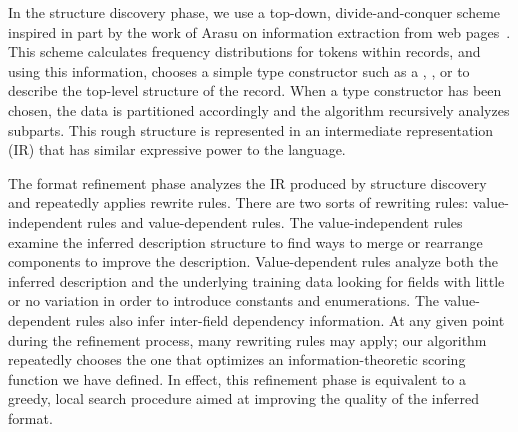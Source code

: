 \documentclass[preprint]{sig-alternate-sigmod08}
\begin{document}
In the structure discovery phase, we use a top-down, divide-and-conquer
scheme inspired in part by the work of Arasu on
information extraction from web pages~\cite{arasu+:sigmod03}. 
This scheme calculates
frequency distributions for tokens within records, and using this information,
chooses a simple type constructor such as a , , or
 to describe the top-level structure of the record. 
When a type constructor has been chosen, the data is partitioned accordingly
and the algorithm recursively analyzes subparts.  This
rough structure is represented in an intermediate representation (IR)
that has similar expressive power to the \pads{} language. 

The format refinement phase analyzes the IR produced by structure discovery
and repeatedly applies 
rewrite rules.  There are two sorts of rewriting rules: 
value-independent rules and value-dependent rules.
The value-independent rules examine the inferred description structure
to find ways to merge or rearrange components to improve the description.
Value-dependent rules analyze both the inferred description and the underlying
training data looking for fields with little or no 
variation in order to introduce constants and enumerations.
The value-dependent rules also infer
inter-field dependency information.
At any given point during the refinement process,
many rewriting rules may apply; our algorithm repeatedly chooses the one 
that optimizes an information-theoretic
scoring function we have defined.
In effect, this refinement phase is equivalent to a greedy, local search
procedure aimed at improving the quality of the inferred format.


%
\end{document}
